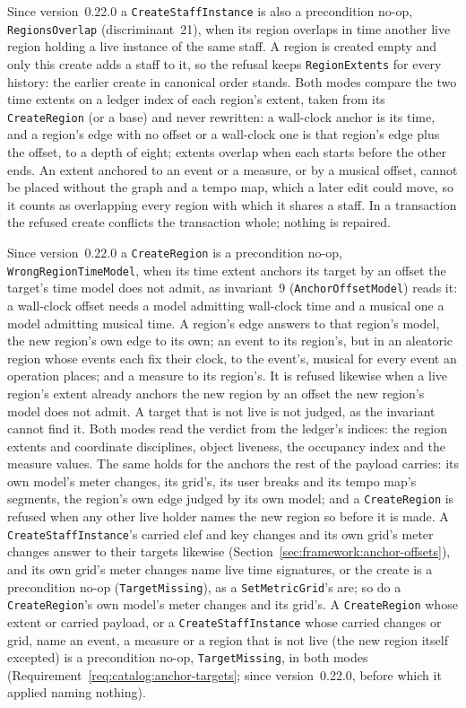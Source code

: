 \documentclass[11pt,letterpaper]{report}
\begin{document}
Since version~0.22.0 a \texttt{CreateStaffInstance} is also a precondition
no-op, \texttt{RegionsOverlap} (discriminant~21), when its region overlaps in
time another live region holding a live instance of the same staff. A region
is created empty and only this create adds a staff to it, so the refusal keeps
\texttt{RegionExtents} for every history: the earlier create in canonical
order stands. Both modes compare the two time extents on a ledger index of
each region's extent, taken from its \texttt{CreateRegion} (or a base) and
never rewritten: a wall-clock anchor is its time, and a region's edge with no
offset or a wall-clock one is that region's edge plus the offset, to a depth
of eight; extents overlap when each starts before the other ends. An extent
anchored to an event or a measure, or by a musical offset, cannot be placed
without the graph and a tempo map, which a later edit could move, so it counts
as overlapping every region with which it shares a staff. In a transaction the
refused create conflicts the transaction whole; nothing is repaired.

Since version~0.22.0 a \texttt{CreateRegion} is a precondition no-op,
\texttt{WrongRegionTimeModel}, when its time extent anchors its target by an
offset the target's time model does not admit, as invariant~9
(\texttt{AnchorOffsetModel}) reads it: a wall-clock offset needs a model
admitting wall-clock time and a musical one a model admitting musical time. A
region's edge answers to that region's model, the new region's own edge to its
own; an event to its region's, but in an aleatoric region whose events each
fix their clock, to the event's, musical for every event an operation places;
and a measure to its region's. It is refused likewise when a live region's
extent already anchors the new region by an offset the new region's model does
not admit. A target that is not live is not judged, as the invariant cannot
find it. Both modes read the verdict from the ledger's indices: the region
extents and coordinate disciplines, object liveness, the occupancy index and
the measure values. The same holds for the anchors the rest of the payload
carries: its own model's meter changes, its grid's, its user breaks and its
tempo map's segments, the region's own edge judged by its own model; and a
\texttt{CreateRegion} is refused when any other live holder names the new region
so before it is made. A \texttt{CreateStaffInstance}'s carried clef and key
changes and its own grid's meter changes answer to their targets likewise
(Section~\ref{sec:framework:anchor-offsets}), and its own grid's meter changes
name live time signatures, or the create is a precondition no-op
(\texttt{TargetMissing}), as a \texttt{SetMetricGrid}'s are; so do a
\texttt{CreateRegion}'s own model's meter changes and its grid's. A
\texttt{CreateRegion} whose extent or carried payload, or a
\texttt{CreateStaffInstance} whose carried changes or grid, name an event, a
measure or a region that is not live (the new region itself excepted) is a
precondition no-op, \texttt{TargetMissing}, in both modes
(Requirement~\ref{req:catalog:anchor-targets}; since version~0.22.0, before
which it applied naming nothing).
\end{document}
